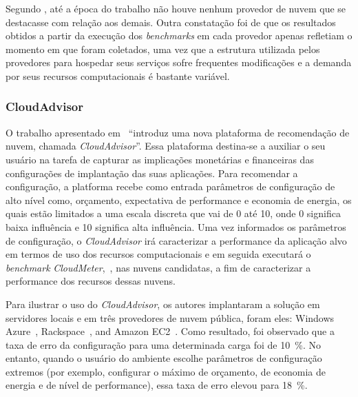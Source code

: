 Segundo , até a época do trabalho não houve
nenhum provedor de nuvem que se destacasse com relação aos demais. Outra constatação foi de que os resultados
obtidos a partir da execução dos {\em benchmarks} em cada provedor apenas refletiam o momento em que foram coletados, uma vez que a estrutura utilizada pelos provedores para hospedar seus serviços sofre frequentes modificações e a demanda por seus recursos computacionais é bastante variável.


\subsubsection{CloudAdvisor}
O trabalho apresentado em~\cite{jung2013cloudadvisor} ``introduz uma nova plataforma de recomendação de nuvem, chamada {\em CloudAdvisor}''. Essa plataforma destina-se a auxiliar o seu usuário na tarefa de capturar as implicações monetárias e financeiras das configurações de implantação das suas aplicações. Para recomendar a configuração, a platforma recebe como entrada parâmetros de configuração de alto nível como, orçamento, expectativa de performance e economia de energia, os quais estão limitados a uma escala discreta que vai de 0 até 10, onde 0 significa baixa influência e 10 significa alta influência. Uma vez informados os parâmetros de configuração, o {\em CloudAdvisor} irá caracterizar a performance da aplicação alvo em termos de uso dos recursos computacionais e em seguida executará o {\em benchmark} {\em CloudMeter},~\cite{jung2013cloudadvisor}, nas nuvens candidatas, a fim de caracterizar a performance dos recursos dessas nuvens.

Para ilustrar o uso do {\em CloudAdvisor}, os autores implantaram a solução em servidores locais e em três provedores de nuvem pública, foram eles: Windows Azure~\cite{azure}, Rackspace~\cite{rackspace}, and Amazon EC2~\cite{ec2}. Como resultado, foi observado que a taxa de erro da configuração para uma determinada carga foi de 10~\%. No entanto, quando o usuário do ambiente escolhe parâmetros de configuração extremos (por exemplo, configurar o máximo de orçamento, de economia de energia e de nível de performance), essa taxa de erro elevou para 18~\%.

